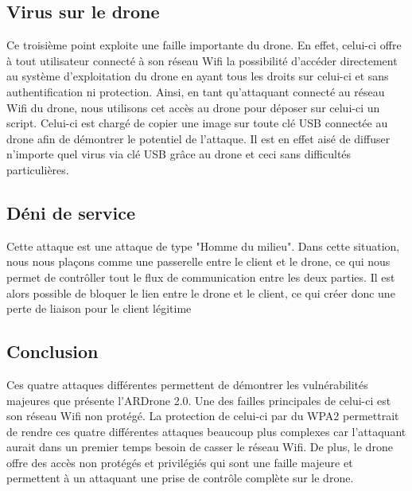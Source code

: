 \subsection{Virus sur le drone}
Ce troisième point exploite une faille importante du drone. En effet, celui-ci offre à tout utilisateur connecté à son réseau Wifi la possibilité d'accéder directement au système
d'exploitation du drone en ayant tous les droits sur celui-ci et sans authentification ni protection. Ainsi, en tant qu'attaquant connecté au réseau Wifi du drone, nous utilisons cet accès au drone pour déposer sur celui-ci un script. Celui-ci est chargé de copier une image sur toute clé USB connectée au drone afin de démontrer le potentiel de l'attaque. Il est en effet aisé de diffuser n'importe quel virus via clé USB grâce au drone et ceci sans difficultés particulières.

\subsection{Déni de service}
Cette attaque est une attaque de type "Homme du milieu". Dans cette situation, nous nous plaçons comme une passerelle entre le client et le drone, ce qui nous permet de contrôller tout le flux de communication entre les deux parties. Il est alors possible de bloquer le lien entre le drone et le client, ce qui créer donc une perte de liaison pour le client légitime

\subsection{Conclusion}
Ces quatre attaques différentes permettent de démontrer les vulnérabilités majeures que présente l'ARDrone 2.0. Une des failles principales de celui-ci est son réseau Wifi non protégé. La protection de celui-ci par du WPA2 permettrait de rendre ces quatre différentes attaques beaucoup plus complexes car l'attaquant aurait dans un premier temps besoin de casser le réseau Wifi. De plus, le drone offre des accès non protégés et privilégiés qui sont une faille majeure et permettent à un attaquant une prise de contrôle complète sur le drone.

